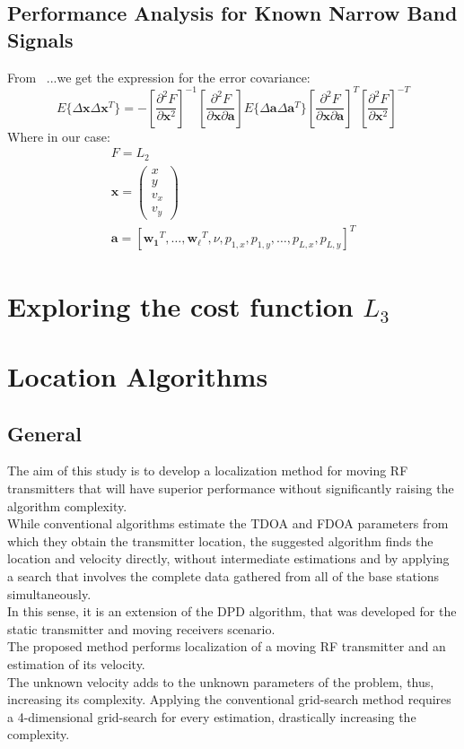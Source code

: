 \documentclass[10pt,a4paper]{report}
\begin{document}
\section{Performance Analysis for Known Narrow Band Signals}
From \
...we get the expression for the error covariance:
\begin{equation}
E\{\Delta \mathbf{x}\Delta \mathbf{x}^T\}=
 -\left[\frac{\partial^2F}{\partial \mathbf{x}^2}\right]^{-1} 
 \left[ \frac{\partial^2 F}{\partial \mathbf{x} \partial \mathbf{a}} \right]
 E\{\Delta \mathbf{a}\Delta \mathbf{a}^T\}
  \left[ \frac{\partial^2 F}{\partial \mathbf{x} \partial \mathbf{a}} \right]^T
  \left[\frac{\partial^2F}{\partial \mathbf{x}^2}\right]^{-T} 
\end{equation}
Where in our case:
\begin{eqnarray}
F=L_2 \\
\mathbf{x} = \begin{pmatrix} x\\y\\v_x\\v_y\end{pmatrix} \nonumber \\
\mathbf{a} = [\mathbf{w_1}^T, \dots ,\mathbf{w_\ell}^T, \nu, p_{1,x}, p_{1,y}, \dots, p_{L,x}, p_{L,y}]^T \nonumber
\end{eqnarray}
\chapter{Exploring the cost function $L_3$}
\chapter{Location Algorithms}
\section{General}
The aim of this study is to develop a localization method for moving RF transmitters that
will have superior performance without significantly raising the algorithm complexity.\\
While conventional algorithms estimate the TDOA and FDOA parameters from which they obtain the transmitter
location, the suggested algorithm finds the location and velocity directly, without intermediate estimations
and by applying a search that involves the complete data gathered from all of the base stations simultaneously. \\
In this sense, it is an extension of the DPD algorithm, that was developed for the static transmitter and moving receivers scenario.\\
 The proposed method performs localization of a moving RF transmitter and an estimation
of its velocity.\\
The unknown velocity adds to the unknown parameters of the problem, thus, increasing its
complexity. Applying the conventional grid-search method requires a 4-dimensional grid-search for every
estimation, drastically increasing the complexity.\\
\end{document}
